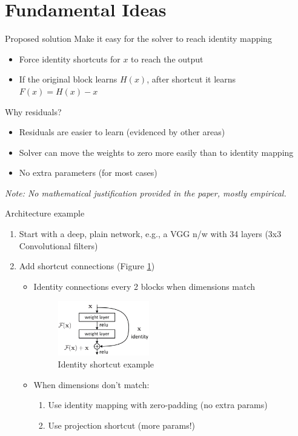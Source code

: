 \documentclass[10pt]{beamer}
\begin{document}
\section{Fundamental Ideas}

	\begin{frame}[fragile]{Proposed solution}
		Make it easy for the solver to reach identity mapping		
		\begin{itemize}
			\item Force identity shortcuts for $x$ to reach the output
			\item If the original block learns $H(x)$, after shortcut it learns $F(x) = H(x) - x$
		\end{itemize}
		Why residuals?
		\begin{itemize}
			\item Residuals are easier to learn (evidenced by other areas)
			\item Solver can move the weights to zero more easily than to identity mapping
			\item No extra parameters (for most cases)
		\end{itemize}
		\small{\textit{Note: No mathematical justification provided in the paper, mostly empirical.}}
	\end{frame}

	\begin{frame}[fragile]{Architecture example}
		\begin{enumerate}
			\item Start with a deep, plain network, e.g., a VGG n/w with 34 layers (3x3 Convolutional filters)		
			\item Add shortcut connections (Figure \ref{fig-shortcut})
				\begin{itemize}
					\item Identity connections every 2 blocks when dimensions match
						\begin{figure}
						\centering
						\includegraphics[width=0.4\textwidth]{residual_conn}
						\caption{Identity shortcut example}
						\label{fig-shortcut}
						\end{figure}
					\item When dimensions don't match:
						\begin{enumerate}
							\item Use identity mapping with zero-padding (no extra params)
							\item Use projection shortcut (more params!)
						\end{enumerate}
				\end{itemize}
			\end{enumerate}
	\end{frame}
\end{document}
